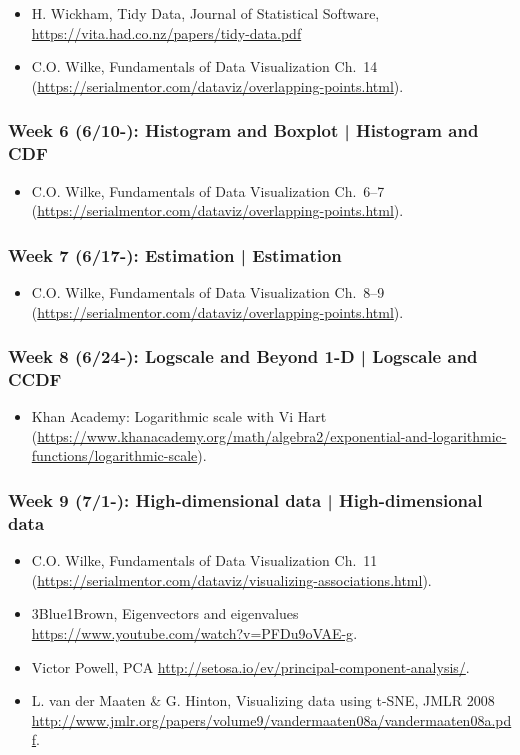 \documentclass[11pt,article,oneside]{memoir} %
\begin{document}
\begin{itemize}\itemsep0em 
\item H. Wickham, Tidy Data, Journal of Statistical Software, \url{https://vita.had.co.nz/papers/tidy-data.pdf}
\item C.O. Wilke, Fundamentals of Data Visualization Ch.~14 (\url{https://serialmentor.com/dataviz/overlapping-points.html}). 
\end{itemize}	
\subsubsection{Week 6 (6/10-): Histogram and Boxplot | Histogram and CDF }%

\begin{itemize}\itemsep0em 
\item C.O. Wilke, Fundamentals of Data Visualization Ch.~6--7 (\url{https://serialmentor.com/dataviz/overlapping-points.html}). 
\end{itemize}	
\subsubsection{Week 7 (6/17-): Estimation | Estimation }%

\begin{itemize}\itemsep0em 
\item C.O. Wilke, Fundamentals of Data Visualization Ch.~8--9 (\url{https://serialmentor.com/dataviz/overlapping-points.html}). 
\end{itemize}	
\subsubsection{Week 8 (6/24-): Logscale and Beyond 1-D | Logscale and CCDF}%

\begin{itemize}\itemsep0em 
\item Khan Academy: Logarithmic scale with Vi Hart (\url{https://www.khanacademy.org/math/algebra2/exponential-and-logarithmic-functions/logarithmic-scale}). 
\end{itemize}	
\subsubsection{Week 9 (7/1-): High-dimensional data | High-dimensional data }%

\begin{itemize}\itemsep0em 
\item C.O. Wilke, Fundamentals of Data Visualization Ch.~11 (\url{https://serialmentor.com/dataviz/visualizing-associations.html}). 
\item 3Blue1Brown, Eigenvectors and eigenvalues \url{https://www.youtube.com/watch?v=PFDu9oVAE-g}. 
\item Victor Powell, PCA \url{http://setosa.io/ev/principal-component-analysis/}.
\item L. van der Maaten \& G. Hinton, Visualizing data using t-SNE, JMLR 2008 \url{http://www.jmlr.org/papers/volume9/vandermaaten08a/vandermaaten08a.pdf}.
\end{itemize}	
\end{document}
